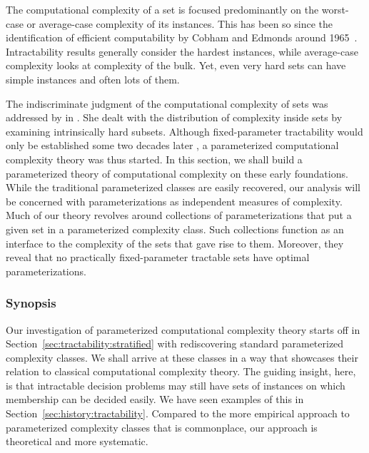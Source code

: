 \label{sec:tractability}%

The computational complexity of a set is focused predominantly on the worst-case or average-case complexity of its instances.
This has been so since the identification of efficient computability by Cobham and Edmonds around 1965~\parencite[for some background, see][]{goldreich2008computational}.
Intractability results \parencite{cook1971complexity,garey1979computers} generally consider the hardest instances, while average-case complexity looks at complexity of the bulk.
Yet, even very hard sets can have simple instances and often lots of them.

The indiscriminate judgment of the computational complexity of sets was addressed by \textcite{lynch1975reducibility} in \citeyear{lynch1975reducibility}.
She dealt with the distribution of complexity inside sets by examining intrinsically hard subsets.
Although fixed-parameter tractability would only be established some two decades later \parencite{downey1992fixed}, a parameterized computational complexity theory was thus started.
In this section, we shall build a parameterized theory of computational complexity on these early foundations.
While the traditional parameterized classes are easily recovered, our analysis will be concerned with parameterizations as independent measures of complexity.
Much of our theory revolves around collections of parameterizations that put a given set in a parameterized complexity class.
Such collections function as an interface to the complexity of the sets that gave rise to them.
Moreover, they reveal that no practically fixed-parameter tractable sets have optimal parameterizations.

\subsubsection*{Synopsis}
Our investigation of parameterized computational complexity theory starts off in Section~\ref{sec:tractability:stratified} with rediscovering standard parameterized complexity classes.
We shall arrive at these classes in a way that showcases their relation to classical computational complexity theory.
The guiding insight, here, is that intractable decision problems may still have sets of instances on which membership can be decided easily.
We have seen examples of this in Section~\ref{sec:history:tractability}.
Compared to the more empirical approach to parameterized complexity classes that is commonplace, our approach is theoretical and more systematic.

